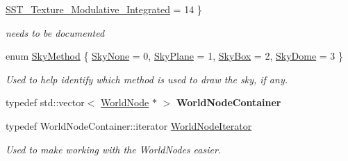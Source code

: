 \begin{DoxyCompactItemize}
\hyperlink{classMezzanine_1_1SceneManager_a8149cd1ec188e0d57935d71c6a7134c6ab4ff7a97c53ca46f7628541c9e39309c}{SST\_\-Texture\_\-Modulative\_\-Integrated} =  14
 \}
\begin{DoxyCompactList}\small\item\em needs to be documented \item\end{DoxyCompactList}\item 
enum \hyperlink{classMezzanine_1_1SceneManager_a80fac0c0b67191cb5450bddde74b470e}{SkyMethod} \{ \hyperlink{classMezzanine_1_1SceneManager_a80fac0c0b67191cb5450bddde74b470ead62543178728c0bcd4e92d463860e571}{SkyNone} =  0, 
\hyperlink{classMezzanine_1_1SceneManager_a80fac0c0b67191cb5450bddde74b470ea95a4503b6f35da0286b384931cb484b8}{SkyPlane} =  1, 
\hyperlink{classMezzanine_1_1SceneManager_a80fac0c0b67191cb5450bddde74b470ea4c80b5621b7b8c3decfc687561b8adf4}{SkyBox} =  2, 
\hyperlink{classMezzanine_1_1SceneManager_a80fac0c0b67191cb5450bddde74b470eaa0c0e7a37ae3ab8ff27a9b7012eaf7fe}{SkyDome} =  3
 \}
\begin{DoxyCompactList}\small\item\em Used to help identify which method is used to draw the sky, if any. \item\end{DoxyCompactList}\item 
\hypertarget{classMezzanine_1_1SceneManager_a0a84880768c2dd0ad8a73ae32bf07a97}{
typedef std::vector$<$ \hyperlink{classMezzanine_1_1WorldNode}{WorldNode} $\ast$ $>$ {\bfseries WorldNodeContainer}}
\label{classMezzanine_1_1SceneManager_a0a84880768c2dd0ad8a73ae32bf07a97}

\item 
\hypertarget{classMezzanine_1_1SceneManager_a498b2390acb176a185e1026d23b773f0}{
typedef WorldNodeContainer::iterator \hyperlink{classMezzanine_1_1SceneManager_a498b2390acb176a185e1026d23b773f0}{WorldNodeIterator}}
\label{classMezzanine_1_1SceneManager_a498b2390acb176a185e1026d23b773f0}

\begin{DoxyCompactList}\small\item\em Used to make working with the WorldNodes easier. \item\end{DoxyCompactList}\end{DoxyCompactItemize}
